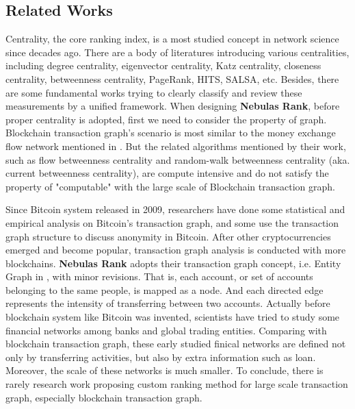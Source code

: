\subsection{Related Works} \label{subsec:related}

Centrality, the core ranking index, is a most studied concept in network science since decades ago\cite{newman2010networks}. There are a body of literatures introducing various centralities, including degree centrality\cite{freeman1979set}, eigenvector centrality\cite{bonacich1972factoring}, Katz centrality\cite{katz1953new}, closeness centrality\cite{sabidussi1966centrality}, betweenness centrality\cite{freeman1977set}\cite{freeman1978centrality}\cite{freeman1991centrality}\cite{noh2004random}\cite{newman2005measure}, PageRank\cite{Brin2010}, HITS\cite{kleinberg1999authoritative}, SALSA\cite{Science2001}, etc. Besides, there are some fundamental works trying to clearly classify and review these measurements by a unified framework\cite{Borgatti2005}\cite{Borgatti2006}\cite{Lu2016}. When designing \textbf{Nebulas Rank}, before proper centrality is adopted, first we need to consider the property of graph. Blockchain transaction graph's scenario is most similar to the money exchange flow network mentioned in \cite{Borgatti2005}. But the related algorithms mentioned by their work, such as flow betweenness centrality\cite{freeman1991centrality} and random-walk betweenness centrality (aka. current betweenness centrality)\cite{newman2005measure}, are compute intensive and do not satisfy the property of "computable" with the large scale of Blockchain transaction graph.

Since Bitcoin\cite{Nakamoto2008} system released in 2009, researchers have done some statistical and empirical analysis on Bitcoin's transaction graph\cite{Ron}\cite{Haslhofer}\cite{NielKondor2014}\cite{Baumann2014}, and some use the transaction graph structure to discuss anonymity in Bitcoin\cite{Meiklejohn2013}\cite{Ober2013}\cite{pham2016anomaly}\cite{Fleder2015}\cite{Ferrin2015}. After other cryptocurrencies emerged and become popular, transaction graph analysis is conducted with more blockchains\cite{Chang2017}\cite{Anderson2016}. \textbf{Nebulas Rank} adopts their transaction graph concept, i.e. Entity Graph in \cite{Tschorsch2015}, with minor revisions. That is, each account, or set of accounts belonging to the same people, is mapped as a node. And each directed edge represents the intensity of transferring between two accounts. Actually before blockchain system like Bitcoin was invented, scientists have tried to study some financial networks among banks and global trading entities\cite{propper2008towards}\cite{Boss2004}\cite{Serrano2007}\cite{Bech2008}\cite{Fagiolo2009}\cite{Morten2006}\cite{Boss2004a}\cite{Krempel2002}\cite{Serrano2003}. Comparing with blockchain transaction graph, these early studied finical networks are defined not only by transferring activities, but also by extra information such as loan. Moreover, the scale of these networks is much smaller. To conclude, there is rarely research work proposing custom ranking method for large scale transaction graph, especially blockchain transaction graph.


